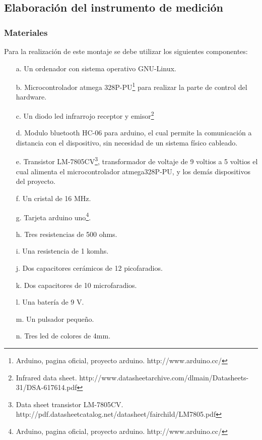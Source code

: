 \documentclass[12pt]{article}
\begin{document}
\begin{multicols}{2}
\subsection{Elaboración del instrumento de medición}

\subsubsection{Materiales}
Para la realización de este montaje se debe utilizar los siguientes componentes:
\begin{enumerate}
\item[a.] Un ordenador con sistema operativo GNU-Linux.
\item[b.] Microcontrolador atmega 328P-PU\footnote{ Arduino, pagina oficial, proyecto arduino. http://www.arduino.cc/} para realizar la parte de control del hardware.
\item[c.] Un diodo led infrarrojo receptor y emisor\footnote{ Infrared data sheet.  http://www.datasheetarchive.com/dlmain/Datasheets-31/DSA-617614.pdf}
\item[d.] Modulo bluetooth HC-06 para arduino, el cual permite la comunicación a distancia con el dispositivo, sin necesidad de un sistema físico cableado.
\item[e.] Transistor LM-7805CV\footnote{ Data sheet transistor LM-7805CV. http://pdf.datasheetcatalog.net/datasheet/fairchild/LM7805.pdf}, transformador de voltaje de 9 voltios a 5 voltios el cual alimenta el microcontrolador atmega328P-PU, y los demás dispositivos del proyecto.
\item[f.] Un cristal de 16 MHz.
\item[g.] Tarjeta arduino uno\footnote{ Arduino, pagina oficial, proyecto arduino. http://www.arduino.cc/}.
\item[h.] Tres resistencias de 500 ohms.
\item[i.] Una resistencia de 1 komhs.
\item[j.] Dos capacitores cerámicos de 12 picofaradios.
\item[k.] Dos capacitores de 10 microfaradios.
\item[l.] Una batería de 9 V.
\item[m.] Un pulsador pequeño.
\item[n.] Tres led de colores de 4mm. 
\end{enumerate}


\end{multicols}
\end{document}
